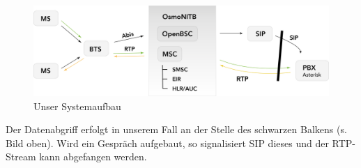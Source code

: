 \begin{figure}[h]
    \centering
    \includegraphics[width=14cm]{includes/aufbau_osmonitb}
    \caption{Unser Systemaufbau}
	\label{fig:osmonitb3}
\end{figure}


Der Datenabgriff erfolgt in unserem Fall an der Stelle des schwarzen Balkens (s. Bild oben). Wird ein Gespräch aufgebaut, so signalisiert SIP dieses und der RTP-Stream kann abgefangen werden.
